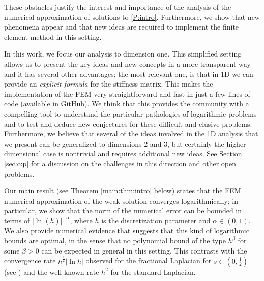 \documentclass[10 pt]{article}
\numberwithin{equation}{section}
\begin{document}
 These obstacles justify the interest and importance of the analysis of the numerical approximation of solutions to \eqref{P:intro}.  Furthermore, we show that new phenomena appear and that new ideas are required to implement the finite element method in this setting.

In this work, we focus our analysis to dimension one. This simplified setting allows us to present the key ideas and new concepts in a more transparent way and it has several other advantages; the most relevant one, is that in 1D we can provide an \emph{explicit formula} for the stiffness matrix.  This makes the implementation of the FEM very straightforward and fast in just a few lines of code (available in GitHub).  We think that this provides the community with a compelling tool to understand the particular pathologies of logarithmic problems and to test and deduce new conjectures for these difficult and elusive problems. Furthermore, we believe that several of the ideas involved in the 1D analysis that we present can be generalized to dimensions 2 and 3, but certainly the higher-dimensional case is nontrivial and requires additional new ideas. See Section \ref{sec:o:p} for a discussion on the challenges in this direction and other open problems.

Our main result (see Theorem \ref{main:thm:intro} below) states that the FEM numerical approximation of the weak solution converges logarithmically; in particular, we show that the norm of the numerical error can be bounded in terms of $|\ln(h)|^{-\alpha}$, where $h$ is the discretization parameter and $\alpha\in(0,1)$. We also provide numerical evidence that suggests that this kind of logarithmic bounds are optimal, in the sense that no polynomial bound of the type $h^\beta$ for some $\beta>0$ can be expected in general in this setting.  This contrasts with the convergence rate $h^\frac{1}{2}|\ln h|$ observed for the fractional Laplacian for $s\in(0,\frac{1}{2})$ (see \cite[Theorem 3.31]{Bor17}) and the well-known rate $h^2$ for the standard Laplacian.
\end{document}
